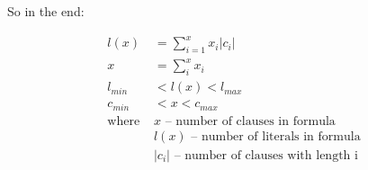 So in the end:

\begin{align}
	l(x) &= \sum_{i=1}^{x} x_i |c_i| \\
	x &= \sum_i^x x_i \\
	l_{min} &< l(x) < l_{max} \\
	c_{min} &< x < c_{max} \\
	\text{where } 
		&x \text{ -- number of clauses in formula} \nonumber \\
		&l(x) \text{ -- number of literals in formula} \nonumber  \\
		&|c_i| \text{ -- number of clauses with length i} \nonumber
\end{align}

